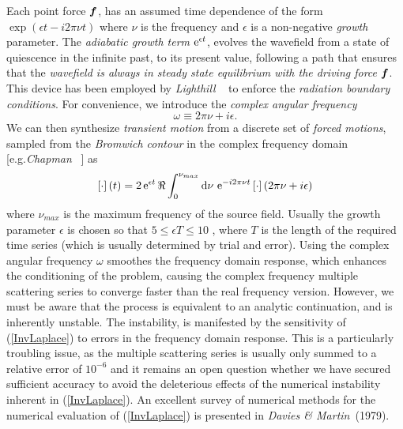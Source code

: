 Each point force  ${\mbox{\boldmath$\mit f$\unboldmath}}$,  has an assumed time 
dependence of the form \linebreak
$\exp(\epsilon t -i 2 \pi \nu t)$ where 
$\nu $ is the  frequency and $\epsilon$ is a non-negative {\em 
growth\/} parameter. The {\em adiabatic growth term\/} ${\rm e}^{\epsilon 
t}$, 
evolves the wavefield from a state of quiescence in the infinite past, to 
its 
present value, following a path that ensures that the {\em wavefield is 
always in steady 
state equilibrium with the driving force\/} ${\mbox{\boldmath$\mit f$\unboldmath}}$. This device has been 
employed by 
{\em Lighthill} ~ to enforce the {\em radiation 
boundary conditions\/}.
For  convenience, we introduce the {\em complex angular frequency\/}
\begin{equation} \label{w+}
\omega\equiv 2 \pi \nu +i \epsilon.
\end{equation}
We can then synthesize {\em transient motion\/} from a discrete set of 
{\em 
forced motions\/}, sampled from the {\em Bromwich contour\/} in the 
complex frequency 
domain [e.g.{\em Chapman} ~] as
\begin{equation}	\label{InvLaplace}
	\left[{\cdot }\right](t)=2 \, {\rm e}^{\epsilon  t}\,
	\Re \int_{ 0}^{\nu_{max}} {\rm d}\nu \ {\rm e}^{ -i 
	2 \pi \nu t}\left[{\cdot }\right] (2 \pi \nu +i \epsilon)
\end{equation}
where $\nu_{{max}}$ is the maximum frequency of the source field. 
Usually the growth parameter $\epsilon$ is chosen so that $5 \le \epsilon T
\le 10$ \cite{Banerjee}, where $T$ is the length of the required time series (which is 
usually determined by trial and error). Using the complex angular frequency $\omega$ smoothes the frequency domain 
response, which enhances the conditioning of the problem, 
causing the complex frequency multiple scattering series to converge 
faster than the real frequency version. However, we must be aware that the 
process is equivalent to an analytic continuation, and is inherently 
unstable. The instability, is manifested by the sensitivity of 
(\ref{InvLaplace}) to errors in the frequency domain response. This is a 
particularly troubling issue, as the multiple scattering series is 
usually only summed to a relative error of $10^{-6}$ and it remains an 
open question whether we have secured sufficient accuracy to avoid the 
deleterious effects of the numerical instability inherent in 
(\ref{InvLaplace}). An excellent survey of numerical methods for the 
numerical evaluation of (\ref{InvLaplace}) is presented in 
{\em Davies \& Martin\/}~(1979).



